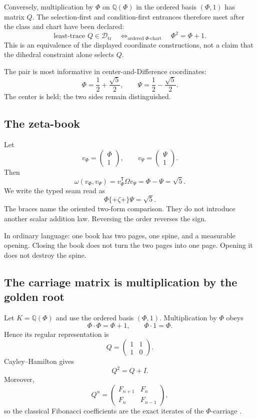 \documentclass[11pt]{article}
\newcommand{\Dtr}{\mathcal D_{\mathrm{tr}}}
\begin{document}
Conversely, multiplication by $\Phi$ on $\mathbb Q(\Phi)$ in the ordered basis $(\Phi,1)$ has matrix $Q$. The selection-first and condition-first entrances therefore meet after the class and chart have been declared:
\[
\boxed{
\text{least-trace }Q\in\Dtr
\quad\Longleftrightarrow_{\text{ordered }\Phi\text{-chart}}\quad
\Phi^2=\Phi+1.
}
\]
This is an equivalence of the displayed coordinate constructions, not a claim that the dihedral constraint alone selects $Q$.

The pair is most informative in center-and-Difference coordinates:
\[
\Phi=\frac12+\frac{\sqrt5}{2},
\qquad
\Psi=\frac12-\frac{\sqrt5}{2}.
\]
The center is held; the two sides remain distinguished.

\subsection{The zeta-book}

Let
\[
v_\Phi=
\begin{pmatrix}\Phi\\1\end{pmatrix},
\qquad
v_\Psi=
\begin{pmatrix}\Psi\\1\end{pmatrix}.
\]
Then
\[
\omega(v_\Phi,v_\Psi)=v_\Phi^{\mathsf T}\Omega v_\Psi=\Phi-\Psi=\sqrt5.
\]
We write the typed seam read as
\[
\boxed{\Phi\{+\zeta+\}\Psi=\sqrt5.}
\]
The braces name the oriented two-form comparison. They do not introduce another scalar addition law. Reversing the order reverses the sign.

In ordinary language: one book has two pages, one spine, and a measurable opening. Closing the book does not turn the two pages into one page. Opening it does not destroy the spine.

\subsection{The carriage matrix is multiplication by the golden root}

Let $K=\mathbb Q(\Phi)$ and use the ordered basis $(\Phi,1)$. Multiplication by $\Phi$ obeys
\[
\Phi\cdot\Phi=\Phi+1,
\qquad
\Phi\cdot1=\Phi.
\]
Hence its regular representation is
\[
\boxed{
Q=
\begin{pmatrix}
1&1\\1&0
\end{pmatrix}.
}
\]
Cayley--Hamilton gives
\[
\boxed{Q^2=Q+I.}
\]
Moreover,
\[
Q^n=
\begin{pmatrix}
F_{n+1}&F_n\\F_n&F_{n-1}
\end{pmatrix},
\]
so the classical Fibonacci coefficients are the exact iterates of the $\Phi$-carriage \cite{CoppaMotionDifference2026,CoppaMinimumRoot2026}.
\end{document}

